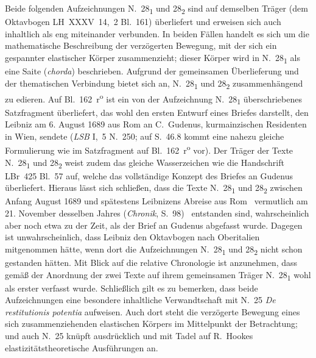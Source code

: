 %
%
%
%
%
\frenchspacing%
%
\footnotesize%
\pstart%
\noindent%
Beide folgenden Aufzeichnungen N.~28\textsubscript{1} und 28\textsubscript{2} sind auf demselben Träger (dem Oktavbogen LH~XXXV~14,~2 Bl.~161) überliefert und erweisen sich auch inhaltlich als eng miteinander verbunden.
In beiden Fällen handelt es sich um die mathematische Beschreibung der verzögerten Bewegung, mit der sich ein gespannter elastischer Körper zusammenzieht; dieser Körper wird in N.~28\textsubscript{1} als eine Saite (\textit{chorda}) beschrieben.
Aufgrund der gemeinsamen Überlieferung und der thematischen Verbindung bietet sich an, N.~28\textsubscript{1} und 28\textsubscript{2} zusammenhängend zu edieren.
\pend
\pstart
Auf Bl.~162~r\textsuperscript{o} ist ein von der Aufzeichnung N.~28\textsubscript{1} überschriebenes Satzfragment überliefert, das wohl den ersten Entwurf eines Briefes darstellt, den Leibniz am 6. August 1689 aus Rom an C.~Gudenus, kurmainzischen Residenten in Wien,\protect{} sendete (\textit{LSB} I,~5 N.~250;\cite{01297} auf S.~46.8 kommt eine nahezu gleiche Formulierung wie im Satzfragment auf Bl.~162~r\textsuperscript{o}\! vor).
Der Träger der Texte N.~28\textsubscript{1} und 28\textsubscript{2} weist zudem das gleiche Wasserzeichen wie die Handschrift LBr~425 Bl.~57 auf, welche das vollständige Konzept des Briefes an Gudenus überliefert.
Hieraus lässt sich schließen, dass die Texte N.~28\textsubscript{1} und 28\textsubscript{2} zwischen Anfang August 1689 und spätestens Leibnizens Abreise aus Rom\protect{} \textendash\ vermutlich am 21. November desselben Jahres (\textit{Chronik}, S.~98\cite{01236}) \textendash\ entstanden sind, wahrscheinlich aber noch etwa zu der Zeit, als der Brief an Gudenus abgefasst wurde.
Dagegen ist unwahrscheinlich, dass Leibniz den Oktavbogen nach Oberitalien\protect{} mitgenommen hätte, wenn dort die Aufzeichnungen N.~28\textsubscript{1} und 28\textsubscript{2} nicht schon gestanden hätten.
\pend
\pstart
Mit Blick auf die relative Chronologie ist anzunehmen, dass gemäß der Anordnung der zwei Texte auf ihrem gemeinsamen Träger N.~28\textsubscript{1} wohl als erster verfasst wurde. 
Schließlich gilt es zu bemerken, dass beide Aufzeichnungen eine besondere inhaltliche Verwandtschaft mit N.~25 \textit{De restitutionis potentia} aufweisen.
Auch dort steht die verzögerte Bewegung eines sich zusammenziehenden elastischen Körpers im Mittelpunkt der Betrachtung; und auch N.~25 knüpft ausdrücklich und mit Tadel auf R.~Hookes\protect{} elastizitätstheoretische Ausführungen an. 
\pend
%
\newpage %
%
\frenchspacing%
%
\normalsize